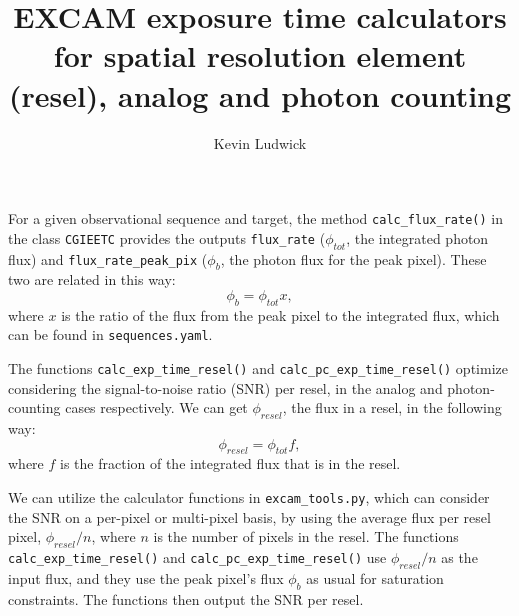 \documentclass{article}
\title{EXCAM exposure time calculators for spatial resolution element (resel), analog and photon counting}
\author{Kevin Ludwick}
\begin{document}
\maketitle


For a given observational sequence and target, the method {\tt calc\_flux\_rate()} in the class {\tt CGIEETC} provides the outputs {\tt flux\_rate} ($\phi_{tot}$, the integrated photon flux) and
{\tt flux\_rate\_peak\_pix} ($\phi_b$, the photon flux for the peak pixel).
These two are related in this way:
\begin{equation}
\label{tot_b_rel}
\phi_b = \phi_{tot} x,
\end{equation}
where $x$ is the ratio of the flux from the peak pixel to the integrated flux, which can be found in {\tt sequences.yaml}.

The functions {\tt calc\_exp\_time\_resel()} and {\tt calc\_pc\_exp\_time\_resel()} optimize considering the signal-to-noise ratio (SNR) per resel, in the analog and photon-counting cases respectively.
We can get $\phi_{resel}$, the flux in a resel, in the following way:
\begin{equation}
\phi_{resel} = \phi_{tot} f,
\end{equation}
where $f$ is the fraction of the integrated flux that is in the resel.

We can utilize the calculator functions in {\tt excam\_tools.py}, which can consider the SNR on a per-pixel or multi-pixel basis, by
using the average flux per resel pixel, $\phi_{resel}/n$, where $n$ is the number of pixels in the resel.
The functions {\tt calc\_exp\_time\_resel()} and {\tt calc\_pc\_exp\_time\_resel()} use $\phi_{resel}/n$ as the input flux, and
they use the peak pixel's flux $\phi_b$ as usual for saturation constraints.  The functions then output the SNR per resel.
\end{document}
